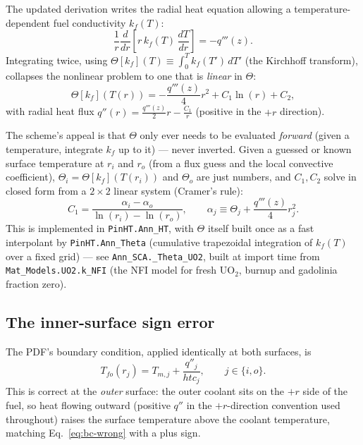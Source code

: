 \documentclass[11pt]{article}
\begin{document}
The updated derivation writes the radial heat equation allowing a
temperature-dependent fuel conductivity $k_f(T)$:
\begin{equation}
\frac{1}{r}\frac{d}{dr}\!\left[r\,k_f(T)\,\frac{dT}{dr}\right] = -q'''(z).
\label{eq:heateq}
\end{equation}
Integrating twice, using $\Theta[k_f](T) \equiv \int_0^T k_f(T')\,dT'$ (the
Kirchhoff transform), collapses the nonlinear problem to one that is
\emph{linear} in $\Theta$:
\begin{equation}
\Theta[k_f](T(r)) = -\frac{q'''(z)}{4}r^2 + C_1 \ln(r) + C_2,
\label{eq:theta}
\end{equation}
with radial heat flux $q''(r) = \frac{q'''(z)}{2}r - \frac{C_1}{r}$ (positive
in the $+r$ direction).

The scheme's appeal is that $\Theta$ only ever needs to be evaluated
\emph{forward} (given a temperature, integrate $k_f$ up to it) --- never
inverted. Given a guessed or known surface temperature at $r_i$ and $r_o$
(from a flux guess and the local convective coefficient), $\Theta_i =
\Theta[k_f](T(r_i))$ and $\Theta_o$ are just numbers, and $C_1, C_2$ solve
in closed form from a $2\times2$ linear system (Cramer's rule):
\begin{equation}
C_1 = \frac{\alpha_i - \alpha_o}{\ln(r_i) - \ln(r_o)}, \qquad
\alpha_j \equiv \Theta_j + \frac{q'''(z)}{4}r_j^2.
\end{equation}
This is implemented in \texttt{PinHT.Ann\_HT}, with $\Theta$ itself built
once as a fast interpolant by \texttt{PinHT.Ann\_Theta} (cumulative
trapezoidal integration of $k_f(T)$ over a fixed grid) --- see
\texttt{Ann\_SCA.\_Theta\_UO2}, built at import time from
\texttt{Mat\_Models.UO2.k\_NFI} (the NFI model for fresh UO$_2$, burnup and
gadolinia fraction zero).

\subsection{The inner-surface sign error}
\label{sec:signerror}

The PDF's boundary condition, applied identically at both surfaces, is
\begin{equation}
T_{fo}(r_j) = T_{m,j} + \frac{q''_j}{htc_j}, \qquad j \in \{i, o\}.
\label{eq:bc-wrong}
\end{equation}
This is correct at the \emph{outer} surface: the outer coolant sits on the
$+r$ side of the fuel, so heat flowing outward (positive $q''$ in the
$+r$-direction convention used throughout) raises the surface temperature
above the coolant temperature, matching Eq.~\ref{eq:bc-wrong} with a plus
sign.
\end{document}
